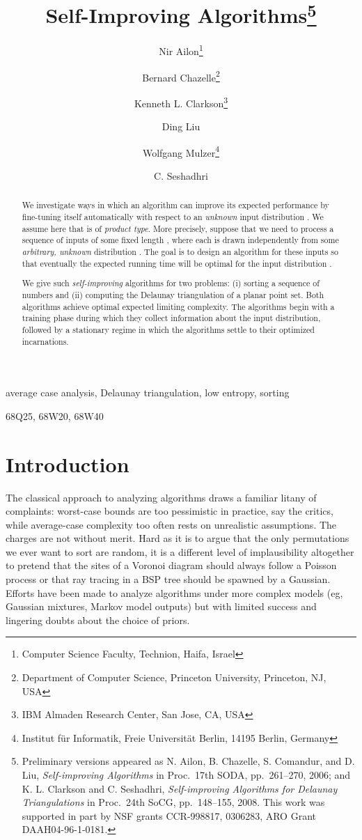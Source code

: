 \documentclass{siamltex}
\title{Self-Improving 
Algorithms\thanks{Preliminary versions appeared as
N. Ailon, B. Chazelle, S. Comandur, and D. Liu,
\emph{Self-improving Algorithms} in Proc.~17th SODA, pp.~261--270, 2006;
and K. L. Clarkson and C. Seshadhri, \emph{Self-improving Algorithms for
Delaunay Triangulations} in Proc.~24th SoCG, pp.~148--155, 2008.
This work was supported
in part by NSF grants CCR-998817, 0306283, 
ARO Grant DAAH04-96-1-0181.}}
\author{
  {Nir Ailon}\thanks{Computer Science Faculty, Technion, Haifa, Israel} 
\and
  {Bernard Chazelle}\thanks{Department of Computer Science,
       Princeton University, Princeton, NJ, USA}
\and
  {Kenneth L. Clarkson}\thanks{IBM Almaden Research Center, San Jose, CA, USA}
\and
  {Ding Liu}\footnotemark[3]
\and
  {Wolfgang Mulzer}\thanks{Institut f\"ur Informatik,
     Freie Universit\"at Berlin, 14195 Berlin, Germany}
\and
  {C. Seshadhri}\footnotemark[4]
}
\begin{document}
\maketitle

\begin{abstract}
We investigate ways in which an algorithm can improve
its expected performance by fine-tuning itself
automatically with respect to an \emph{unknown} input 
distribution .
We assume here that  is of \emph{product type}.
More precisely, suppose that we need to process a sequence
 of inputs  of
some fixed length , where each  is drawn independently from some
\emph{arbitrary, unknown} distribution . The goal is to
design an algorithm for these inputs so that eventually
the expected running time will be optimal for the 
input distribution .

We give such \emph{self-improving} algorithms  
for two problems: (i) sorting a sequence of numbers and (ii) computing 
the Delaunay triangulation of a planar point set. 
Both algorithms achieve optimal expected limiting complexity.
The algorithms begin with a training phase
during which they collect information about the input distribution,
followed by a stationary regime in which the algorithms settle to their
optimized incarnations. 
\end{abstract}

\begin{keywords}
average case analysis, Delaunay triangulation, low entropy, sorting
\end{keywords}

\begin{AMS}
68Q25, 68W20, 68W40
\end{AMS}

\pagestyle{myheadings}
\thispagestyle{plain}

\section{Introduction}\label{sec:introduction}

The classical approach to analyzing algorithms 
draws a familiar litany of complaints:
worst-case bounds are too pessimistic
in practice, say the critics, while
average-case complexity too often rests on unrealistic assumptions.
The charges are not without merit.
Hard as it is to argue that the only permutations we ever
want to sort are random, it is a different level of implausibility
altogether to pretend that the sites of a Voronoi diagram 
should always follow a Poisson
process or that ray tracing in a BSP tree should be spawned by
a Gaussian. Efforts have been made 
to analyze algorithms under more complex models
(eg, Gaussian mixtures, Markov model outputs) but 
with limited success and lingering doubts about 
the choice of priors.
\end{document}
